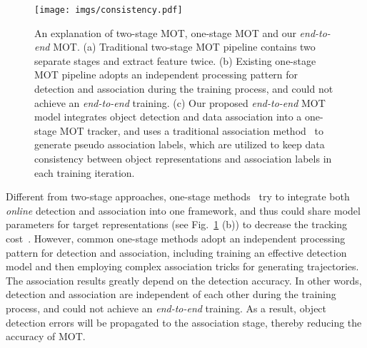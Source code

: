 \documentclass[acmsmall]{acmart}
\begin{document}
\begin{figure}[t]
	\centering
	\texttt{[image: imgs/consistency.pdf]}
	\caption{
		{An explanation of two-stage MOT, one-stage MOT and our \emph{end-to-end} MOT. 
		(a) Traditional two-stage MOT pipeline contains two separate stages and extract feature twice.
		(b) Existing one-stage MOT pipeline adopts an independent processing pattern for detection and association during the training process, 
		and could not achieve an \emph{end-to-end} training. 
		(c) Our proposed \emph{end-to-end} MOT model integrates object detection and data association into a one-stage MOT tracker, 
		and uses a traditional association method~\cite{welch1995introduction} to generate pseudo association labels, which are utilized to keep data consistency between object representations and association labels in each training iteration.
		}
	}
	\label{fig:consistency}
\end{figure}

{Different from two-stage approaches, one-stage methods~\cite{jde,voigtlaender2019mots} try to integrate both \emph{online} detection and association into one framework, } 
{and thus could} share model parameters for target {representations (see Fig.~\ref{fig:consistency} (b)) to} decrease the tracking cost~\cite{jde,memory_improved}. 
{
However, common one-stage methods adopt an independent processing pattern for detection and association,
including training an effective detection model and then employing complex association tricks for generating trajectories. 
The association results greatly depend on the detection accuracy.
In other words, detection and association are independent of each other during the training process, 
and could not achieve an \emph{end-to-end} training.
As a result, object detection errors will be propagated to the association stage, thereby reducing the accuracy of MOT. 
}
\end{document}
